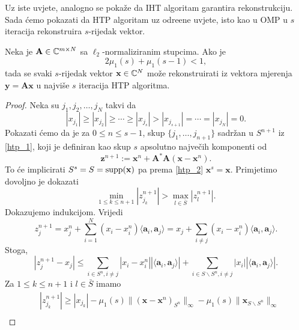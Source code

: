 \documentclass[a4paper,twoside,12pt]{memoir} %
\newcommand{\vect}[1]{\mathbf{#1}}
\renewcommand{\vec}{\vect}
\newcommand{\supp}{\text{\normalfont{supp}}}
\newcommand{\norm}[1]{\|{#1}\|}
\begin{document}
Uz iste uvjete, analogno se poka\v{z}e da IHT algoritam garantira rekonstrukciju. Sada \'cemo pokazati da HTP algoritam uz odre\dj ene uvjete, isto kao u OMP u $s$ iteracija rekonstruira $s$-rijedak vektor.
\begin{thm}\label{tm:5:17}
    Neka je $\vec A \in \C^{m \times N}$ sa $\ell_2$-normaliziranim stupcima. Ako je
    \begin{equation*}
        2 \mu_1(s) + \mu_1(s-1) < 1, 
    \end{equation*}
    tada se svaki $s$-rijedak vektor $\vec x \in \C^N$ mo\v{z}e rekonstruirati iz vektora mjerenja $ \vec y = \vec{Ax}$ u najvi\v{s}e $s$ iteracija HTP algoritma.
\end{thm}
\begin{proof}
    Neka su $j_1, j_2, \dots, j_N$ takvi da
    \begin{equation*}
        |x_{j_1}| \geq |x_{j_2}| \geq \cdots \geq |x_{j_s}| > |x_{j_{s+1}}| = \cdots = |x_{j_N}| = 0.
    \end{equation*}
    Pokazati \'cemo da je za $0 \leq n \leq s - 1$, skup $\{j_1, \dots, j_{n+1}\}$ sadr\v{z}an u $S^{n+1}$ iz \eqref{htp_1}, koji je definiran kao skup $s$ apsolutno najve\v{c}ih komponenti od 
    \begin{equation}\label{5:18}
        \vec z^{n+1} := \vec x^n + \vec A^* \vec A(\vec x - \vec x^n). 
    \end{equation}
    To \'ce implicirati $S^s = S = \supp(\vec x)$ pa prema \eqref{htp_2} $\vec x^s = \vec x$. Primjetimo dovoljno je dokazati
    \begin{equation}\label{5:19}
        \min_{1 \leq k \leq n+1} |z_{j_k}^{n+1}| > \max_{l \in \bar S}|z_{l}^{n+1}|.
    \end{equation}
    Dokazujemo indukcijom. Vrijedi
    \begin{equation*}
        z_j^{n+1} = x_j^n + \sum_{i = 1}^N (x_i - x_i^n) \langle \vec a_i, \vec a_j \rangle = x_j + \sum_{i \neq j}(x_i - x_i^n) \langle \vec a_i, \vec a_j \rangle.
    \end{equation*}
    Stoga,
    \begin{equation}\label{5:20}
        |z_j^{n+1} - x_j| \leq \sum_{i \in S^n, i \neq j} |x_i - x_i^n|| \langle \vec a_i, \vec a_j \rangle| + \sum_{i \in S \backslash S^n, i \neq j} |x_i||\langle \vec a_i, \vec a_j \rangle|.
    \end{equation}
    Za $1 \leq k \leq n + 1$ i $l \in \bar S$ imamo
    \begin{align} 
        &|z_{j_k}^{n+1}| \geq |x_{j_k}| - \mu_1(s)\norm{ ( \vec x - \vec x^n )_{S^n} }_{\infty } - \mu_1(s) \norm{\vec x_{S \backslash S^n}}_{\infty} \label{5:21} \\[1em]

\end{align}
\end{proof}
\end{document}
